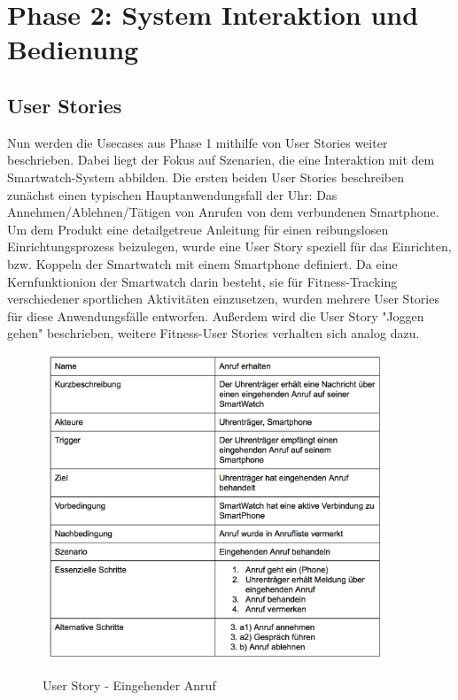 \chapter{Phase 2: System Interaktion und Bedienung}

\section{User Stories}

Nun werden die Usecases aus Phase 1 mithilfe von User Stories weiter beschrieben. Dabei liegt der Fokus auf Szenarien, die eine Interaktion mit dem Smartwatch-System abbilden.
Die ersten beiden User Stories beschreiben zunächst einen typischen Hauptanwendungsfall der Uhr: Das Annehmen/Ablehnen/Tätigen von Anrufen von dem verbundenen Smartphone.
Um dem Produkt eine detailgetreue Anleitung für einen reibungslosen Einrichtungsprozess beizulegen, wurde eine User Story speziell für das Einrichten, bzw. Koppeln der Smartwatch mit einem Smartphone definiert.
Da eine Kernfunktionion der Smartwatch darin besteht, sie für Fitness-Tracking verschiedener sportlichen Aktivitäten einzusetzen, wurden mehrere User Stories für diese Anwendungsfälle entworfen. Außerdem wird die User Story "Joggen gehen" beschrieben, weitere Fitness-User Stories verhalten sich analog dazu.
\begin{figure}[H]
\centering\
\includegraphics[width=10cm]{img/story_in}
\caption{User Story - Eingehender Anruf}\label{fig:story-in}
\end{figure}

